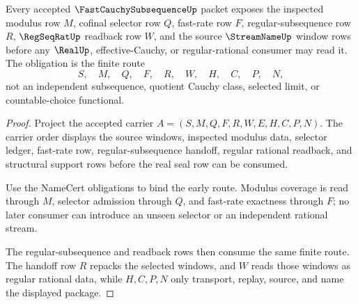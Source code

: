 \begin{theorem}
\label{thm:fast-cauchy-subsequence-regular-readback-obligation}
Every accepted $\FastCauchySubsequenceUp$ packet exposes the inspected modulus row $M$, cofinal selector row $Q$, fast-rate row $F$, regular-subsequence row $R$, $\RegSeqRatUp$ readback row $W$, and the source $\StreamNameUp$ window rows before any $\RealUp$, effective-Cauchy, or regular-rational consumer may read it. The obligation is the finite route
$$
S,\quad M,\quad Q,\quad F,\quad R,\quad W,\quad H,\quad C,\quad P,\quad N,
$$
not an independent subsequence, quotient Cauchy class, selected limit, or countable-choice functional.
\end{theorem}
\begin{proof}
Project the accepted carrier $A=(S,M,Q,F,R,W,E,H,C,P,N)$. The carrier order displays the source windows, inspected modulus data, selector ledger, fast-rate row, regular-subsequence handoff, regular rational readback, and structural support rows before the real seal row can be consumed.

Use the NameCert obligations to bind the early route. Modulus coverage is read through $M$, selector admission through $Q$, and fast-rate exactness through $F$; no later consumer can introduce an unseen selector or an independent rational stream.

The regular-subsequence and readback rows then consume the same finite route. The handoff row $R$ repacks the selected windows, and $W$ reads those windows as regular rational data, while $H,C,P,N$ only transport, replay, source, and name the displayed package.
\end{proof}

